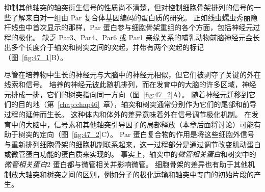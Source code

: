 抑制其他轴突的轴突衍生信号的性质尚不清楚，但对控制细胞骨架排列的信号的一些了解来自对一组由 Par 复合体基因编码的蛋白质的研究。
正如线虫蠕虫秀丽隐杆线虫中首次显示的那样，Par 蛋白参与细胞骨架重组的各个方面，包括神经元过程的极化。
缺乏 Par3、Par4、Par6 或 Par1 亲缘关系的哺乳动物前脑神经元会长出多个长度介于轴突和树突之间的突起，并带有两个突起的标记（图~\ref{fig:47_1}B）。


尽管在培养物中生长的神经元与大脑中的神经元相似，但它们被剥夺了关键的外在线索和信号。
培养的神经元彼此随机排列，而在发育中的大脑的许多区域，神经元排成一排，它们的树突指向同一方向（图~\ref{fig:47_2}A）。
随着神经元迁移到它们的目的地（第~\ref{chap:chap46}~章），轴突和树突通常分别作为它们的尾部和前导过程的延伸而生长。
这种体内和体外的差异意味着外在信号调节极化机制。 在发育中的大脑中，信号素和其他轴突引导因子的局部释放（本章后面将讨论）可能有助于树突的定向（图~\ref{fig:47_2}C）。
Par 蛋白复合物的作用是将这些细胞外信号与重新排列细胞骨架的细胞机制联系起来，这一过程部分是通过调节改变肌动蛋白或微管蛋白功能的蛋白质来实现的。
事实上，轴突中的\textit{微管相关蛋白}和树突中的 \textit{微管相关蛋白}2 蛋白都与微管相关并影响微管。
细胞骨架的差异也有助于其他机制放大轴突和树突之间的区别，例如分子的极化运输和轴突中专门的初始片段的产生。


